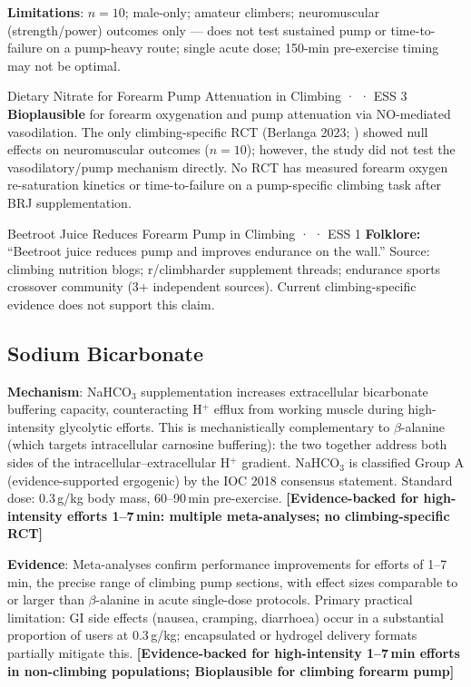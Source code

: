 \textbf{Limitations}: $n{=}10$; male-only; amateur climbers; neuromuscular (strength/power) outcomes only --- does not test sustained pump or time-to-failure on a pump-heavy route; single acute dose; 150-min pre-exercise timing may not be optimal.

\begin{bioplausbox}{Dietary Nitrate for Forearm Pump Attenuation in Climbing · \bioplausible · ESS 3}
\textbf{Bioplausible} for forearm oxygenation and pump attenuation via NO-mediated vasodilation. The only climbing-specific RCT (Berlanga 2023; \cite{BLSML+23}) showed null effects on neuromuscular outcomes ($n{=}10$); however, the study did not test the vasodilatory/pump mechanism directly. No RCT has measured forearm oxygen re-saturation kinetics or time-to-failure on a pump-specific climbing task after BRJ supplementation.
\end{bioplausbox}

\begin{folklorebox}{Beetroot Juice Reduces Forearm Pump in Climbing · \folkloreverified · ESS 1}
\textbf{Folklore:} ``Beetroot juice reduces pump and improves endurance on the wall.'' Source: climbing nutrition blogs; r/climbharder supplement threads; endurance sports crossover community (3+ independent sources). Current climbing-specific evidence does not support this claim.
\end{folklorebox}

\subsection{Sodium Bicarbonate}
\label{subsec:nabic}

\textbf{Mechanism}: NaHCO$_3$ supplementation increases extracellular bicarbonate buffering capacity, counteracting H$^+$ efflux from working muscle during high-intensity glycolytic efforts. This is mechanistically complementary to $\beta$-alanine (which targets intracellular carnosine buffering): the two together address both sides of the intracellular--extracellular H$^+$ gradient. NaHCO$_3$ is classified Group A (evidence-supported ergogenic) by the IOC 2018 consensus statement. Standard dose: 0.3\,g/kg body mass, 60--90\,min pre-exercise. \textbf{[Evidence-backed for high-intensity efforts 1--7\,min: multiple meta-analyses; no climbing-specific RCT]}

\textbf{Evidence}: Meta-analyses confirm performance improvements for efforts of 1--7\,min, the precise range of climbing pump sections, with effect sizes comparable to or larger than $\beta$-alanine in acute single-dose protocols. Primary practical limitation: GI side effects (nausea, cramping, diarrhoea) occur in a substantial proportion of users at 0.3\,g/kg; encapsulated or hydrogel delivery formats partially mitigate this. \textbf{[Evidence-backed for high-intensity 1--7\,min efforts in non-climbing populations; Bioplausible for climbing forearm pump]}

